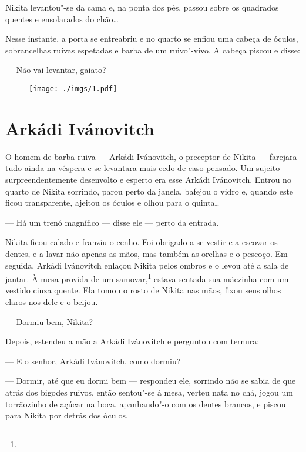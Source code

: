 Nikita levantou"-se da cama e, na ponta dos pés, passou sobre os
quadrados quentes e ensolarados do chão\ldots{}

Nesse instante, a porta se entreabriu e no quarto se enfiou uma cabeça
de óculos, sobrancelhas ruivas espetadas e barba de um ruivo"-vivo. A
cabeça piscou e disse:

--- Não vai levantar, gaiato?

\begin{figure}
\vspace*{-2.65cm}
\hspace*{-3.25cm}\texttt{[image: ./imgs/1.pdf]}
\end{figure}

\chapter{Arkádi Ivánovitch}

O homem de barba ruiva --- Arkádi Ivánovitch, o preceptor de Nikita ---
farejara tudo ainda na véspera e se levantara mais cedo de caso pensado.
Um sujeito surpreendentemente desenvolto e esperto era esse Arkádi
Ivánovitch. Entrou no quarto de Nikita sorrindo, parou perto da janela,
bafejou o vidro e, quando este ficou transparente, ajeitou os óculos e
olhou para o quintal.

--- Há um trenó magnífico --- disse ele --- perto da entrada.

Nikita ficou calado e franziu o cenho. Foi obrigado a se vestir e a
escovar os dentes, e a lavar não apenas as mãos, mas também as orelhas e
o pescoço. Em seguida, Arkádi Ivánovitch enlaçou Nikita pelos ombros e o
levou até a sala de jantar. À mesa provida de um samovar,\footnote{} estava sentada
sua mãezinha com um vestido cinza quente. Ela tomou o rosto de Nikita
nas mãos, fixou seus olhos claros nos dele e o beijou.

--- Dormiu bem, Nikita?

Depois, estendeu a mão a Arkádi Ivánovitch e perguntou com ternura:

--- E o senhor, Arkádi Ivánovitch, como dormiu?

--- Dormir, até que eu dormi bem --- respondeu ele, sorrindo não se sabia
de que atrás dos bigodes ruivos, então sentou"-se à mesa, verteu nata no chá,
jogou um torrãozinho de açúcar na boca, apanhando"-o com os dentes brancos,
e piscou para Nikita por detrás dos óculos.

